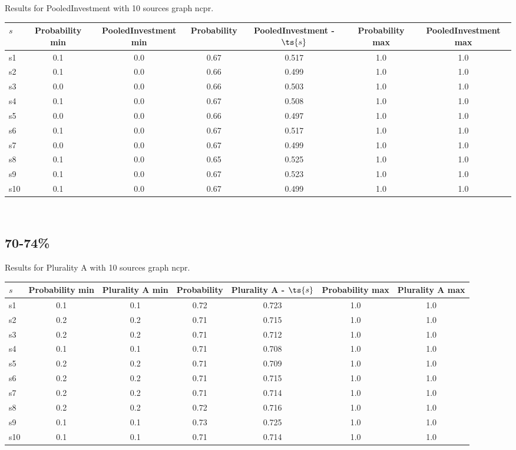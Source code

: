 \documentclass{article}
\begin{document}
\noindent Results for PooledInvestment with 10 sources graph ncpr.

\noindent\begin{tabular}{|l|c|c|c|c|c|c|}
\hline
$s$& Probability min & PooledInvestment min & Probability & PooledInvestment - $\ts{s}$ & Probability max & PooledInvestment max\\
\hline
s1 &0.1 & 0.0 & 0.67 & 0.517 & 1.0 & 1.0\\
\hline
s2 &0.1 & 0.0 & 0.66 & 0.499 & 1.0 & 1.0\\
\hline
s3 &0.0 & 0.0 & 0.66 & 0.503 & 1.0 & 1.0\\
\hline
s4 &0.1 & 0.0 & 0.67 & 0.508 & 1.0 & 1.0\\
\hline
s5 &0.0 & 0.0 & 0.66 & 0.497 & 1.0 & 1.0\\
\hline
s6 &0.1 & 0.0 & 0.67 & 0.517 & 1.0 & 1.0\\
\hline
s7 &0.0 & 0.0 & 0.67 & 0.499 & 1.0 & 1.0\\
\hline
s8 &0.1 & 0.0 & 0.65 & 0.525 & 1.0 & 1.0\\
\hline
s9 &0.1 & 0.0 & 0.67 & 0.523 & 1.0 & 1.0\\
\hline
s10 &0.1 & 0.0 & 0.67 & 0.499 & 1.0 & 1.0\\
\hline
\end{tabular}\\

\newpage

\subsection{70-74\%}

\noindent Results for Plurality A with 10 sources graph ncpr.

\noindent\begin{tabular}{|l|c|c|c|c|c|c|}
\hline
$s$& Probability min & Plurality A min & Probability & Plurality A - $\ts{s}$ & Probability max & Plurality A max\\
\hline
s1 &0.1 & 0.1 & 0.72 & 0.723 & 1.0 & 1.0\\
\hline
s2 &0.2 & 0.2 & 0.71 & 0.715 & 1.0 & 1.0\\
\hline
s3 &0.2 & 0.2 & 0.71 & 0.712 & 1.0 & 1.0\\
\hline
s4 &0.1 & 0.1 & 0.71 & 0.708 & 1.0 & 1.0\\
\hline
s5 &0.2 & 0.2 & 0.71 & 0.709 & 1.0 & 1.0\\
\hline
s6 &0.2 & 0.2 & 0.71 & 0.715 & 1.0 & 1.0\\
\hline
s7 &0.2 & 0.2 & 0.71 & 0.714 & 1.0 & 1.0\\
\hline
s8 &0.2 & 0.2 & 0.72 & 0.716 & 1.0 & 1.0\\
\hline
s9 &0.1 & 0.1 & 0.73 & 0.725 & 1.0 & 1.0\\
\hline
s10 &0.1 & 0.1 & 0.71 & 0.714 & 1.0 & 1.0\\
\hline
\end{tabular}\\
\end{document}
